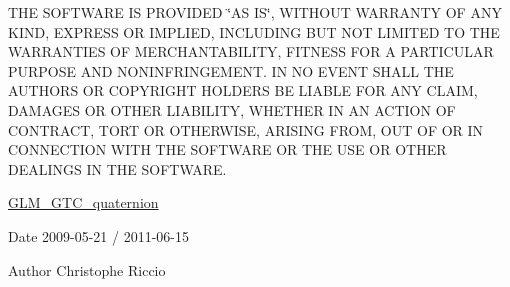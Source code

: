 T\+H\+E S\+O\+F\+T\+W\+A\+R\+E I\+S P\+R\+O\+V\+I\+D\+E\+D \char`\"{}\+A\+S I\+S\char`\"{}, W\+I\+T\+H\+O\+U\+T W\+A\+R\+R\+A\+N\+T\+Y O\+F A\+N\+Y K\+I\+N\+D, E\+X\+P\+R\+E\+S\+S O\+R I\+M\+P\+L\+I\+E\+D, I\+N\+C\+L\+U\+D\+I\+N\+G B\+U\+T N\+O\+T L\+I\+M\+I\+T\+E\+D T\+O T\+H\+E W\+A\+R\+R\+A\+N\+T\+I\+E\+S O\+F M\+E\+R\+C\+H\+A\+N\+T\+A\+B\+I\+L\+I\+T\+Y, F\+I\+T\+N\+E\+S\+S F\+O\+R A P\+A\+R\+T\+I\+C\+U\+L\+A\+R P\+U\+R\+P\+O\+S\+E A\+N\+D N\+O\+N\+I\+N\+F\+R\+I\+N\+G\+E\+M\+E\+N\+T. I\+N N\+O E\+V\+E\+N\+T S\+H\+A\+L\+L T\+H\+E A\+U\+T\+H\+O\+R\+S O\+R C\+O\+P\+Y\+R\+I\+G\+H\+T H\+O\+L\+D\+E\+R\+S B\+E L\+I\+A\+B\+L\+E F\+O\+R A\+N\+Y C\+L\+A\+I\+M, D\+A\+M\+A\+G\+E\+S O\+R O\+T\+H\+E\+R L\+I\+A\+B\+I\+L\+I\+T\+Y, W\+H\+E\+T\+H\+E\+R I\+N A\+N A\+C\+T\+I\+O\+N O\+F C\+O\+N\+T\+R\+A\+C\+T, T\+O\+R\+T O\+R O\+T\+H\+E\+R\+W\+I\+S\+E, A\+R\+I\+S\+I\+N\+G F\+R\+O\+M, O\+U\+T O\+F O\+R I\+N C\+O\+N\+N\+E\+C\+T\+I\+O\+N W\+I\+T\+H T\+H\+E S\+O\+F\+T\+W\+A\+R\+E O\+R T\+H\+E U\+S\+E O\+R O\+T\+H\+E\+R D\+E\+A\+L\+I\+N\+G\+S I\+N T\+H\+E S\+O\+F\+T\+W\+A\+R\+E.

\hyperlink{group__gtc__quaternion}{G\+L\+M\+\_\+\+G\+T\+C\+\_\+quaternion}

\begin{DoxyDate}{Date}
2009-\/05-\/21 / 2011-\/06-\/15 
\end{DoxyDate}
\begin{DoxyAuthor}{Author}
Christophe Riccio 
\end{DoxyAuthor}
